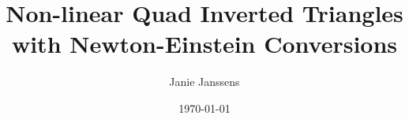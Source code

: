 \documentclass[11pt,a4paper,UKenglish]{memoir}
\title{Non-linear Quad Inverted Triangles with Newton-Einstein Conversions}
\author{Janie Janssens}
\date{\today}
\begin{document}
\frontmatter





\newpage





\newpage
\tableofcontents

\newpage
\listoffigures

\newpage
\listoftables

\newpage
\makenomenclature
\printnomenclature

\mainmatter
%











\backmatter %
\end{document}
